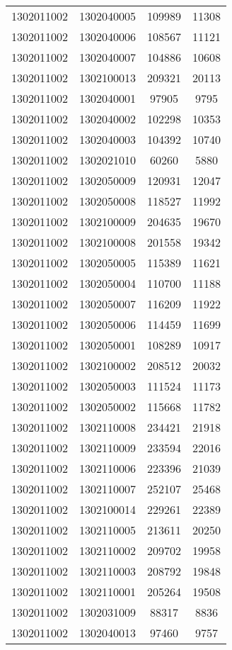 \begin{longtable}[h]{llcc}
		1302011002 & 1302040005 & 109989 & 11308\\
		1302011002 & 1302040006 & 108567 & 11121\\
		1302011002 & 1302040007 & 104886 & 10608\\
		1302011002 & 1302100013 & 209321 & 20113\\
		1302011002 & 1302040001 & 97905 & 9795\\
		1302011002 & 1302040002 & 102298 & 10353\\
		1302011002 & 1302040003 & 104392 & 10740\\
		1302011002 & 1302021010 & 60260 & 5880\\
		1302011002 & 1302050009 & 120931 & 12047\\
		1302011002 & 1302050008 & 118527 & 11992\\
		1302011002 & 1302100009 & 204635 & 19670\\
		1302011002 & 1302100008 & 201558 & 19342\\
		1302011002 & 1302050005 & 115389 & 11621\\
		1302011002 & 1302050004 & 110700 & 11188\\
		1302011002 & 1302050007 & 116209 & 11922\\
		1302011002 & 1302050006 & 114459 & 11699\\
		1302011002 & 1302050001 & 108289 & 10917\\
		1302011002 & 1302100002 & 208512 & 20032\\
		1302011002 & 1302050003 & 111524 & 11173\\
		1302011002 & 1302050002 & 115668 & 11782\\
		1302011002 & 1302110008 & 234421 & 21918\\
		1302011002 & 1302110009 & 233594 & 22016\\
		1302011002 & 1302110006 & 223396 & 21039\\
		1302011002 & 1302110007 & 252107 & 25468\\
		1302011002 & 1302100014 & 229261 & 22389\\
		1302011002 & 1302110005 & 213611 & 20250\\
		1302011002 & 1302110002 & 209702 & 19958\\
		1302011002 & 1302110003 & 208792 & 19848\\
		1302011002 & 1302110001 & 205264 & 19508\\
		1302011002 & 1302031009 & 88317 & 8836\\
		1302011002 & 1302040013 & 97460 & 9757\\

\end{longtable}
